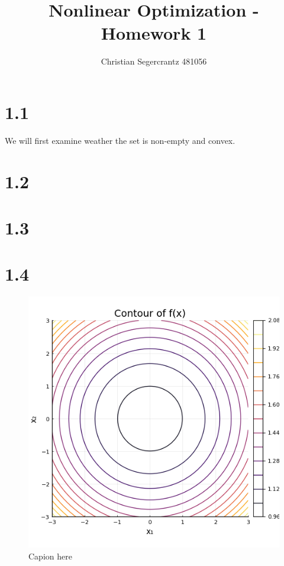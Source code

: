 \documentclass{article}
\title{Nonlinear Optimization - Homework 1 }
\author{Christian Segercrantz 481056}
\begin{document}
	\maketitle
	\pagebreak
\section*{1.1}
	We will first examine weather the set is non-empty and convex. 

\section*{1.2}
\section*{1.3}
\section*{1.4}

\begin{figure}[H]
	\centering
	\includegraphics{plots/1_4c_contour.png}
	\caption{Capion here}
	\label{fig:1.4c}
\end{figure}
\end{document}

